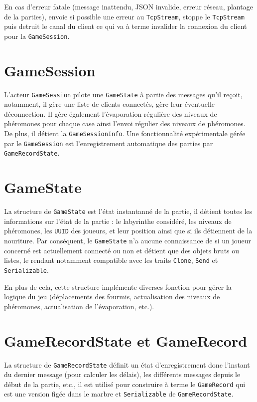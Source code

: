 \documentclass{EPUProjetDi}
\begin{document}
En cas d'erreur fatale (message inattendu, JSON invalide, erreur réseau, plantage de la parties), envoie si possible une erreur au \verb|TcpStream|, stoppe le \verb|TcpStream| puis detruit le canal du client ce qui va à terme invalider la connexion du client pour la \verb|GameSession|.

\section{GameSession}

L'acteur \verb|GameSession| pilote une \verb|GameState| à partie des messages qu'il reçoit, notamment, il gère une liste de clients connectés, gère leur éventuelle déconnection. Il gère également l'évaporation régulière des niveaux de phéromones pour chaque case ainsi l'envoi régulier des niveaux de phéromones.
De plus, il détient la \verb|GameSessionInfo|.
Une fonctionnalité expérimentale gérée par le \verb|GameSession| est l'enregistrement automatique des parties par \verb|GameRecordState|.

\section{GameState}

La structure de \verb|GameState| est l'état instantanné de la partie, il détient toutes les informations sur l'état de la partie : le labyrinthe considéré, les niveaux de phéromones, les \verb|UUID| des joueurs, et leur position ainsi que si ils détiennent de la nouriture.
Par conséquent, le \verb|GameState| n'a aucune connaissance de si un joueur concerné est actuellement connecté ou non et détient que des objets bruts ou listes, le rendant notamment compatible avec les traits \verb|Clone|, \verb|Send| et \verb|Serializable|. 

En plus de cela, cette structure implémente diverses fonction pour gérer la logique du jeu (déplacements des fourmis, actualisation des niveaux de phéromones, actualisation de l'évaporation, etc.).

\section{GameRecordState et GameRecord}

La structure de \verb|GameRecordState| définit un état d'enregistrement donc l'instant du dernier message (pour calculer les délais), les différents messages depuis le début de la partie, etc., il est utilisé pour construire à terme le \verb|GameRecord| qui est une version figée dans le marbre et \verb|Serializable| de \verb|GameRecordState|.
\end{document}

